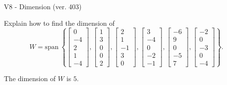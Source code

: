 \begin{exercise}
  \begin{exerciseTitle}V8 - Dimension (ver. 403)\end{exerciseTitle}
  \begin{exerciseStatement}
    Explain how to find the dimension of 
\[W=\mathrm{span}\ \left\{\left[\begin{array}{r}
0 \\
-4 \\
2 \\
1 \\
-4
\end{array}\right] , \left[\begin{array}{r}
1 \\
3 \\
0 \\
0 \\
2
\end{array}\right] , \left[\begin{array}{r}
2 \\
1 \\
-1 \\
3 \\
0
\end{array}\right] , \left[\begin{array}{r}
3 \\
-4 \\
0 \\
-2 \\
-1
\end{array}\right] , \left[\begin{array}{r}
-6 \\
9 \\
0 \\
-5 \\
7
\end{array}\right] , \left[\begin{array}{r}
-2 \\
0 \\
-3 \\
0 \\
-4
\end{array}\right]\right\}.\]



  \end{exerciseStatement}
  \begin{exerciseAnswer}
   The dimension of \(W\) is  \(5\).
  


  \end{exerciseAnswer}
\end{exercise}